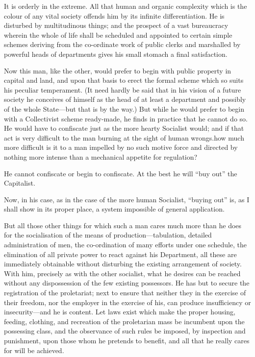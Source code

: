 \documentclass{book}
\begin{document}
It is orderly in the extreme. All that human and organic complexity which is the colour of any vital society offends him by its infinite differentiation. He is disturbed by multitudinous things; and the prospect of a vast bureaucracy wherein the whole of life shall be scheduled and appointed to certain simple schemes deriving from the co-ordinate work of public clerks and marshalled by powerful heads of departments gives his small stomach a final satisfaction.

Now this man, like the other, would prefer to begin with public property in capital and land, and upon that basis to erect the formal scheme which so suits his peculiar temperament. (It need hardly be said that in his vision of a future society he conceives of himself as the head of at least a department and possibly of the whole State—but that is by the way.) But while he would prefer to begin with a Collectivist scheme ready-made, he finds in practice that he cannot do so. He would have to confiscate just as the more hearty Socialist would; and if that act is very difficult to the man burning at the sight of human wrongs.how much more difficult is it to a man impelled by no such motive force and directed by nothing more intense than a mechanical appetite for regulation?

He cannot confiscate or begin to confiscate. At the best he will “buy out” the Capitalist.

Now, in his case, as in the case of the more human Socialist, “buying out” is, as I shall show in its proper place, a system impossible of general application.

But all those other things for which such a man cares much more than he does for the socialisation of the means of production—tabulation, detailed administration of men, the co-ordination of many efforts under one schedule, the elimination of all private power to react against his Department, all these are immediately obtainable without disturbing the existing arrangement of society. With him, precisely as with the other socialist, what he desires can be reached without any dispossession of the few existing possessors. He has but to secure the registration of the proletariat; next to ensure that neither they in the exercise of their freedom, nor the employer in the exercise of his, can produce insufficiency or insecurity—and he is content. Let laws exist which make the proper housing, feeding, clothing, and recreation of the proletarian mass be incumbent upon the possessing class, and the observance of such rules be imposed, by inspection and punishment, upon those whom he pretends to benefit, and all that he really cares for will be achieved.
\end{document}

